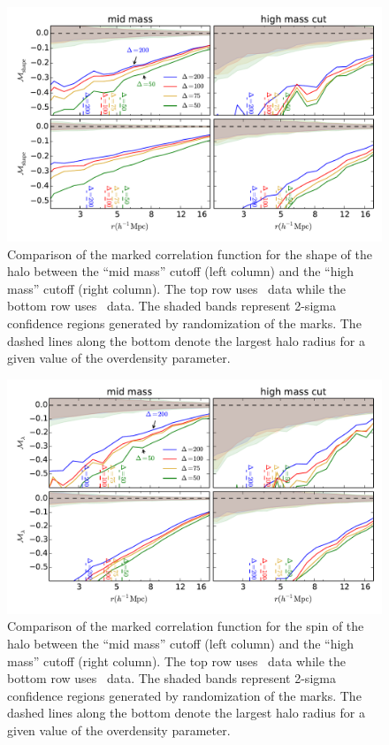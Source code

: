 \documentclass[usenatbib,usegraphicx,letterpaper]{mn2e}
\begin{document}
\begin{figure}
	\centering
	\includegraphics[width=.9\textwidth]{all_mcf_s_z00_hostsvhigh.pdf}
	\caption{Comparison of the marked correlation function for the shape of the halo between the ``mid mass'' cutoff (left column) and the ``high mass'' cutoff (right column). The top row uses \simB \ data while the bottom row uses \simC \ data. The shaded bands represent 2-sigma confidence regions generated by randomization of the marks. The dashed lines along the bottom denote the largest halo radius for a given value of the overdensity parameter.}
	\label{fig:hvh_mcf_s}
\end{figure}

\begin{figure}
	\centering
	\includegraphics[width=.9\textwidth]{all_mcf_spin_z00_hostsvhigh.pdf}
	\caption{Comparison of the marked correlation function for the spin of the halo between the ``mid mass'' cutoff (left column) and the ``high mass'' cutoff (right column). The top row uses \simB \ data while the bottom row uses \simC \ data. The shaded bands represent 2-sigma confidence regions generated by randomization of the marks. The dashed lines along the bottom denote the largest halo radius for a given value of the overdensity parameter.}
	\label{fig:hvh_mcf_spin}
\end{figure}
\end{document}
